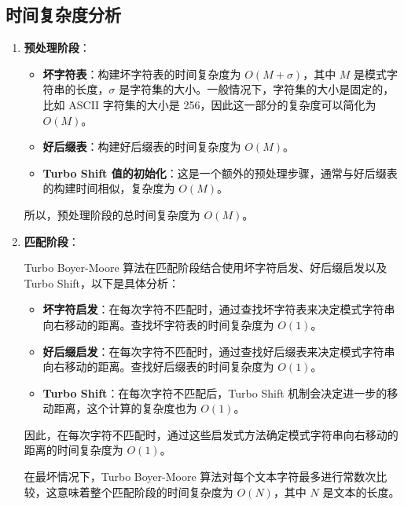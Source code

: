 \documentclass{report}
\begin{document}
\subsection{时间复杂度分析}
\begin{enumerate}
    \item \textbf{预处理阶段}：

    \begin{itemize}
        \item \textbf{坏字符表}：构建坏字符表的时间复杂度为 $O(M + \sigma)$，其中 $M$ 是模式字符串的长度，$\sigma$ 是字符集的大小。一般情况下，字符集的大小是固定的，比如 ASCII 字符集的大小是 256，因此这一部分的复杂度可以简化为 $O(M)$。
        
        \item \textbf{好后缀表}：构建好后缀表的时间复杂度为 $O(M)$。
        
        \item \textbf{Turbo Shift 值的初始化}：这是一个额外的预处理步骤，通常与好后缀表的构建时间相似，复杂度为 $O(M)$。
    \end{itemize}
    
    所以，预处理阶段的总时间复杂度为 $O(M)$。

    \item \textbf{匹配阶段}：

    Turbo Boyer-Moore 算法在匹配阶段结合使用坏字符启发、好后缀启发以及 Turbo Shift，以下是具体分析：

    \begin{itemize}
        \item \textbf{坏字符启发}：在每次字符不匹配时，通过查找坏字符表来决定模式字符串向右移动的距离。查找坏字符表的时间复杂度为 $O(1)$。
        
        \item \textbf{好后缀启发}：在每次字符不匹配时，通过查找好后缀表来决定模式字符串向右移动的距离。查找好后缀表的时间复杂度为 $O(1)$。
        
        \item \textbf{Turbo Shift}：在每次字符不匹配后，Turbo Shift 机制会决定进一步的移动距离，这个计算的复杂度也为 $O(1)$。
    \end{itemize}

    因此，在每次字符不匹配时，通过这些启发式方法确定模式字符串向右移动的距离的时间复杂度为 $O(1)$。

    在最坏情况下，Turbo Boyer-Moore 算法对每个文本字符最多进行常数次比较，这意味着整个匹配阶段的时间复杂度为 $O(N)$，其中 $N$ 是文本的长度。

\end{enumerate}
\end{document}
